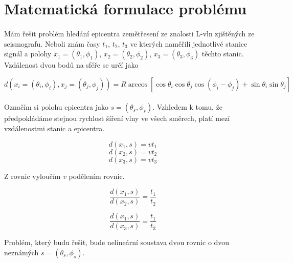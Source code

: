 \documentclass{article}
\begin{document}
    \section{Matematická formulace problému}
    \paragraph{} Mám řešit problém hledání epicentra zemětřesení ze znalosti L-vln
        zjištěných ze seismografu. Neboli znám časy $t_{1}$, $t_{2}$, $t_{3}$ ve kterých
        naměřili jednotlivé stanice signál a polohy $x_1 = (\theta_{1}, \phi_{1})$, 
        $x_2 = (\theta_{2}, \phi_{2})$, $x_3 = (\theta_{3}, \phi_{3})$ těchto stanic. Vzdálenost
        dvou bodů na sféře se určí jako

    \begin{equation}
        d(x_{i} = (\theta_{i}, \phi_{i}), x_{j} = (\theta_{j}, \phi_{j})) = R \arccos \left[ \cos \theta_{i} \cos \theta_{j} \cos(\phi_{i} - \phi_{j}) + \sin \theta_{i} \sin \theta_{j} \right]
    \end{equation}
        
    \paragraph{} Označím si polohu epicentra jako $s = (\theta_{s}, \phi_{s})$. Vzhledem k tomu, že
        předpokládáme stejnou rychlost šíření vlny ve všech směrech, platí mezí vzdálenostmi 
        stanic a epicentra.

    \begin{equation}
        d(x_1, s) = v t_1
    \end{equation}
    \begin{equation}
        d(x_2, s) = v t_2
    \end{equation}
    \begin{equation}
        d(x_3, s) = v t_3
    \end{equation}

    Z rovnic vyloučím $v$ podělením rovnic.

    \begin{equation}
        \frac{d(x_1, s)}{d(x_2, s)} = \frac{t_1}{t_2}
    \end{equation}

    \begin{equation}
        \frac{d(x_1, s)}{d(x_3, s)} = \frac{t_1}{t_3}
    \end{equation}

    Problém, který budu řešit, bude nelineární soustava dvou rovnic o dvou neznámých 
    $s = (\theta_{s}, \phi_{s})$.
\end{document}

